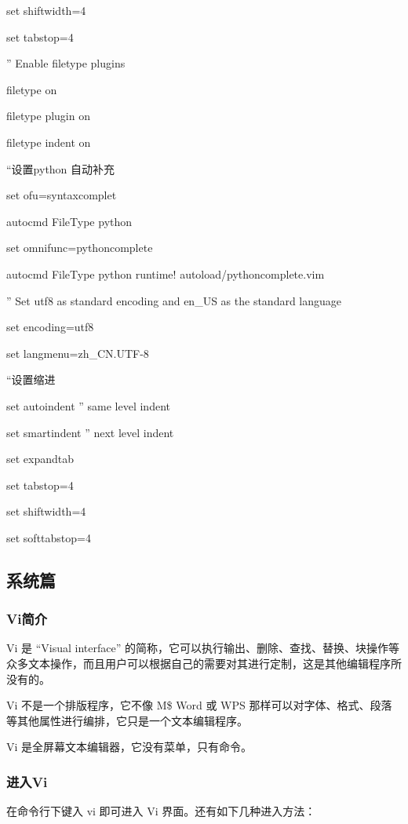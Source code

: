 \documentclass[letterpaper,10pt]{sphinxmanual}
\begin{document}
set shiftwidth=4

set tabstop=4

'' Enable filetype plugins

filetype on

filetype plugin on

filetype indent on

``设置python 自动补充

set ofu=syntaxcomplet

autocmd FileType python

set omnifunc=pythoncomplete

autocmd FileType python runtime! autoload/pythoncomplete.vim

'' Set utf8 as standard encoding and en\_US as the standard language

set encoding=utf8

set langmenu=zh\_CN.UTF-8

``设置缩进

set autoindent '' same level indent

set smartindent '' next level indent

set expandtab

set tabstop=4

set shiftwidth=4

set softtabstop=4


\subsection{系统篇}
\label{Linux_vim/command::doc}\label{Linux_vim/command:id1}

\subsubsection{Vi简介}
\label{Linux_vim/command:vi}
Vi 是 “Visual interface” 的简称，它可以执行输出、删除、查找、替换、块操作等众多文本操作，而且用户可以根据自己的需要对其进行定制，这是其他编辑程序所没有的。

Vi 不是一个排版程序，它不像 M\$ Word 或 WPS 那样可以对字体、格式、段落等其他属性进行编排，它只是一个文本编辑程序。

Vi 是全屏幕文本编辑器，它没有菜单，只有命令。


\subsubsection{进入Vi}
\label{Linux_vim/command:id2}
在命令行下键入 vi 即可进入 Vi 界面。还有如下几种进入方法：
\end{document}
